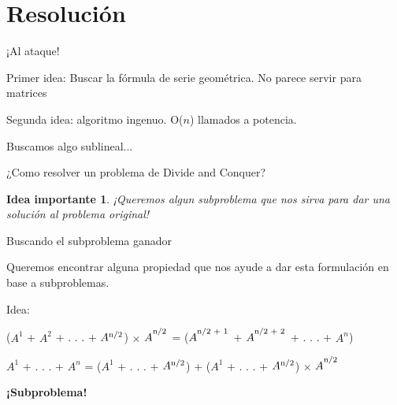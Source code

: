 \documentclass[pdf]{beamer}
\newtheorem{idea}{Idea importante}
\begin{document}
\section{Resolución}

\begin{frame}{¡Al ataque!}
    \par{Primer idea: \pause Buscar la fórmula de serie geométrica. \pause No parece servir para \alert{matrices}}
    \pause
    \vspace{1em}
    \par{Segunda idea: \pause algoritmo ingenuo. \pause \alert{O($n$)} llamados a potencia.}
    \pause
    \vspace{1em}
    \par{Buscamos algo sublineal...}
    \pause
    
    \vspace{1em}
    
    ¿Como resolver un problema de Divide and Conquer?
    
    \pause
    
    \begin{idea}
	¡Queremos algun subproblema que nos sirva para dar una solución al problema original!
    \end{idea}
\end{frame}

\begin{frame}{Buscando el subproblema ganador}
    \par{Queremos encontrar alguna propiedad que nos ayude a dar esta formulación en base a subproblemas.}
    \vspace{1em}
    
    \pause
    
    \par{Idea: }
    
    ($A^1$ + $A^2$ + . . . + $A\textsuperscript{n/2}$) $\times$ $A^\textsuperscript{n/2}$ = ($A^\textsuperscript{n/2 + 1}$ + $A^\textsuperscript{n/2 + 2}$ + . . . + $A^n$)
    
    \pause
    \vspace{1em}
    
    \par{$A^1$ + . . . + $A^n$ = \alert<4>{($A^1$ + . . . + $A\textsuperscript{n/2}$)} + ($A^1$ + . . . + $A\textsuperscript{n/2}$) $\times$ $A^\textsuperscript{n/2}$}
    \pause
    \par{\textbf{¡Subproblema!}}
    
    
\end{frame}
\end{document}
